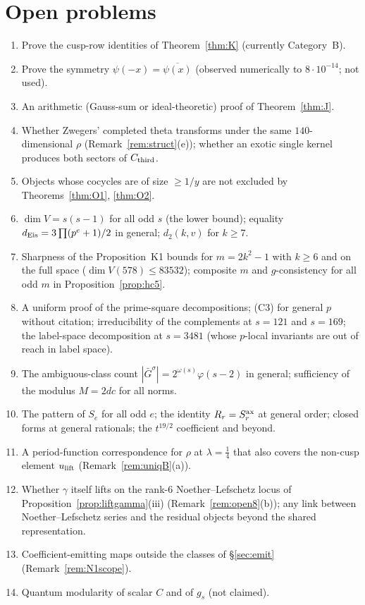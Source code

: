 \section{Open problems}\label{sec:open}
\begin{enumerate}[label=\arabic*.,leftmargin=2em]
\item Prove the cusp-row identities of Theorem~\ref{thm:K} (currently Category~B).
\item Prove the symmetry $\psi(-x)=\overline{\psi(x)}$ (observed numerically to $8\cdot10^{-14}$; not used).
\item An arithmetic (Gauss-sum or ideal-theoretic) proof of Theorem~\ref{thm:J}.
\item Whether Zwegers' completed theta transforms under the same $140$-dimensional $\rho$ (Remark~\ref{rem:struct}(e)); whether an exotic single kernel produces both sectors of $C_{\mathrm{third}}$.
\item Objects whose cocycles are of size $\ge1/y$ are not excluded by Theorems~\ref{thm:O1}, \ref{thm:O2}.
\item $\dim V=s(s-1)$ for all odd $s$ (the lower bound); equality $d_{\rm Eis}=3\prod(p^e+1)/2$ in general; $d_2(k,v)$ for $k\ge7$.
\item Sharpness of the Proposition~K1 bounds for $m=2k^2-1$ with $k\ge6$ and on the full space ($\dim V(578)\le83532$); composite $m$ and $g$-consistency for all odd $m$ in Proposition~\ref{prop:hc5}.
\item A uniform proof of the prime-square decompositions; (C3) for general $p$ without citation; irreducibility of the complements at $s=121$ and $s=169$; the label-space decomposition at $s=3481$ (whose $p$-local invariants are out of reach in label space).
\item The ambiguous-class count $|\bar G^\sigma|=2^{\omega(s)}\varphi(s-2)$ in general; sufficiency of the modulus $M=2dc$ for all norms.
\item The pattern of $S_e$ for all odd $e$; the identity $R_r=S^{\rm ax}_r$ at general order; closed forms at general rationals; the $t^{19/2}$ coefficient and beyond.
\item A period-function correspondence for $\rho$ at $\lambda=\tfrac14$ that also covers the non-cusp element $u_{\rm lift}$ (Remark~\ref{rem:uniqB}(a)).
\item Whether $\gamma$ itself lifts on the rank-$6$ Noether--Lefschetz locus of Proposition~\ref{prop:liftgamma}(iii) (Remark~\ref{rem:open8}(b)); any link between Noether--Lefschetz series and the residual objects beyond the shared representation.
\item Coefficient-emitting maps outside the classes of \S\ref{sec:emit} (Remark~\ref{rem:N1scope}).
\item Quantum modularity of scalar $C$ and of $g_s$ (not claimed).
\end{enumerate}

